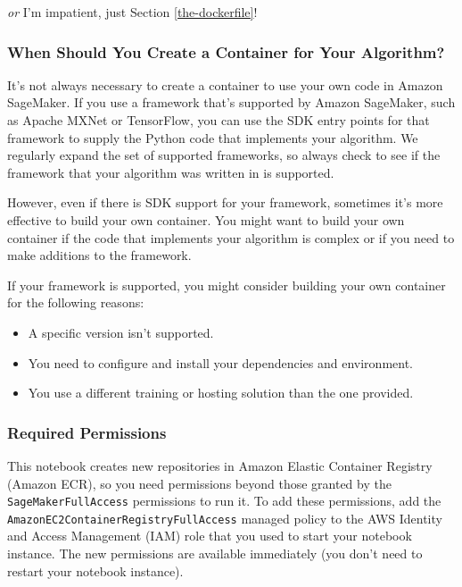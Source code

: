 \documentclass[11pt]{article}
\providecommand{\tightlist}{%
      \setlength{\itemsep}{0pt}\setlength{\parskip}{0pt}}
\begin{document}
\emph{or} I'm impatient, just Section \ref{the-dockerfile}!

\subsubsection{When Should You Create a Container for Your
Algorithm?}\label{when-should-you-create-a-container-for-your-algorithm}

It's not always necessary to create a container to use your own code in
Amazon SageMaker. If you use a framework that's supported by Amazon
SageMaker, such as Apache MXNet or TensorFlow, you can use the SDK entry
points for that framework to supply the Python code that implements your
algorithm. We regularly expand the set of supported frameworks, so
always check to see if the framework that your algorithm was written in
is supported.

However, even if there is SDK support for your framework, sometimes it's
more effective to build your own container. You might want to build your
own container if the code that implements your algorithm is complex or
if you need to make additions to the framework.

If your framework is supported, you might consider building your own
container for the following reasons:

\begin{itemize}
\tightlist
\item
  A specific version isn't supported.
\item
  You need to configure and install your dependencies and environment.
\item
  You use a different training or hosting solution than the one
  provided.
\end{itemize}

\subsubsection{Required Permissions}\label{required-permissions}

This notebook creates new repositories in Amazon Elastic Container
Registry (Amazon ECR), so you need permissions beyond those granted by
the \texttt{SageMakerFullAccess} permissions to run it. To add these
permissions, add the \texttt{AmazonEC2ContainerRegistryFullAccess}
managed policy to the AWS Identity and Access Management (IAM) role that
you used to start your notebook instance. The new permissions are
available immediately (you don't need to restart your notebook
instance).
\end{document}
